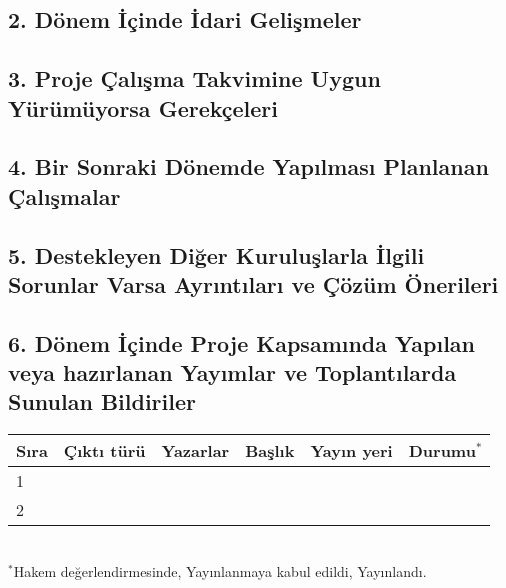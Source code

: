 \documentclass[a4paper,10pt]{article}
\newcommand{\hr}{\noindent\makebox[\linewidth]{\rule{\paperwidth}{0.4pt}}}
\begin{document}
\hr\noindent\subsection*{2. Dönem İçinde İdari Gelişmeler}
\null 




\hr\noindent\subsection*{3. Proje Çalışma Takvimine Uygun Yürümüyorsa Gerekçeleri}
\null 



\hr\noindent\subsection*{4. Bir Sonraki Dönemde Yapılması Planlanan Çalışmalar}
\null 




\hr\noindent\subsection*{5. Destekleyen Diğer Kuruluşlarla İlgili Sorunlar Varsa Ayrıntıları ve Çözüm Önerileri}
\null 



\hr\noindent\subsection*{6. Dönem İçinde Proje Kapsamında Yapılan veya hazırlanan Yayımlar ve Toplantılarda Sunulan Bildiriler}
\null

\normalsize
\begin{tabular}{|l|l|l|l|l|l|}
\hline
\textbf{Sıra} & \textbf{Çıktı türü} & \textbf{Yazarlar} & \textbf{Başlık} & \textbf{Yayın yeri} & \textbf{Durumu$^\ast$} \\ \hline
1             &                     &                   &                 &                     &                 \\ \hline
2             &                     &                   &                 &                     &                 \\ \hline
\end{tabular}\\

$^\ast$Hakem değerlendirmesinde, Yayınlanmaya kabul edildi, Yayınlandı.
\end{document}

